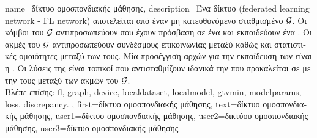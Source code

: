 {name={\foreignlanguage{greek}{δίκτυο ομοσπονδιακής μάθησης}},
	description={\foreignlanguage{greek}{Ένα δίκτυο}  
		(federated learning network - FL network) \foreignlanguage{greek}{αποτελείται από έναν μη κατευθυνόμενο 
		σταθμισμένο}  $\mathcal{G}$. \foreignlanguage{greek}{Οι κόμβοι του $\mathcal{G}$ 
		αντιπροσωπεύ\-ουν}  \foreignlanguage{greek}{που έχουν πρόσβαση σε ένα} 
		 \foreignlanguage{greek}{και εκπαιδεύουν ένα} . 
		\foreignlanguage{greek}{Οι ακμές του $\mathcal{G}$ αντιπροσωπεύ\-ουν συνδέσμους επικοινωνίας μεταξύ} 
		 \foreignlanguage{greek}{καθώς και στατιστικές ομοιότητες μεταξύ των}  
		\foreignlanguage{greek}{τους. Μία προσέγγιση αρχών για την εκπαίδευση των}  
		\foreignlanguage{greek}{είναι η} . \foreignlanguage{greek}{Οι λύσεις της}  
		\foreignlanguage{greek}{είναι τοπικοί}  \foreignlanguage{greek}{που αντισταθμίζουν ιδανικά 
		την}  \foreignlanguage{greek}{που προκαλείται σε}  \foreignlanguage{greek}{με την} 
		 \foreignlanguage{greek}{τους μεταξύ των ακμών του} $\mathcal{G}$. \\
	    	\foreignlanguage{greek}{Βλέπε επίσης:} \gls{fl}, \gls{graph}, \gls{device}, \gls{localdataset}, \gls{localmodel}, \gls{gtvmin},
		\gls{modelparams}, \gls{loss}, \gls{discrepancy}. },
	  first={\foreignlanguage{greek}{δίκτυο ομοσπονδιακής μάθησης}},
	  text={\foreignlanguage{greek}{δίκτυο ομοσπονδιακής μάθησης}},
	  user1={\foreignlanguage{greek}{δίκτυο ομοσπονδιακής μάθησης}}, %
  	  user2={\foreignlanguage{greek}{δικτύου ομοσπονδιακής μάθησης}}, %
	  user3={\foreignlanguage{greek}{δίκτυο ομοσπονδιακής μάθησης}} %
}

